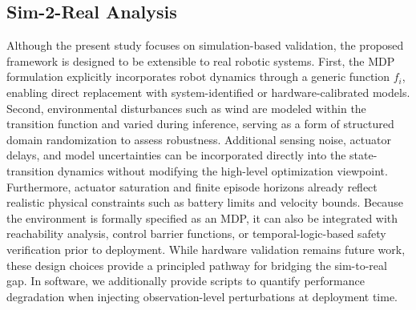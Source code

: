 \documentclass{article}
\begin{document}
\subsection{Sim-2-Real Analysis}
Although the present study focuses on simulation-based validation, the proposed framework is designed to be extensible to real robotic systems. First, the MDP formulation explicitly incorporates robot dynamics through a generic function $f_i$, enabling direct replacement with system-identified or hardware-calibrated models. Second, environmental disturbances such as wind are modeled within the transition function and varied during inference, serving as a form of structured domain randomization to assess robustness. Additional sensing noise, actuator delays, and model uncertainties can be incorporated directly into the state-transition dynamics without modifying the high-level optimization viewpoint. Furthermore, actuator saturation and finite episode horizons already reflect realistic physical constraints such as battery limits and velocity bounds. Because the environment is formally specified as an MDP, it can also be integrated with reachability analysis, control barrier functions, or temporal-logic-based safety verification prior to deployment. While hardware validation remains future work, these design choices provide a principled pathway for bridging the sim-to-real gap. In software, we additionally provide scripts to quantify performance degradation when injecting observation-level perturbations at deployment time.
\end{document}
